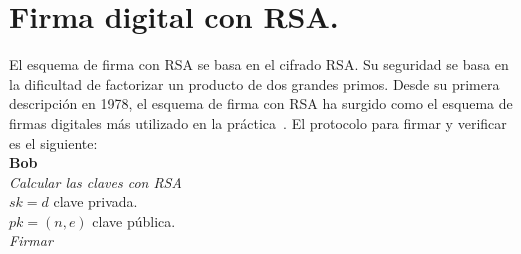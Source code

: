 










\section{Firma digital con RSA. }

El esquema de firma con RSA se basa en el cifrado RSA. Su seguridad se basa en la dificultad de factorizar un producto de dos grandes primos. Desde su primera descripción en 1978, el esquema de firma con RSA ha surgido como el esquema de firmas digitales más utilizado en la práctica~\cite{paar}. El protocolo para firmar y verificar es el siguiente: \\

\textbf{Bob}\\
\textit{Calcular las claves con RSA} \\

$ sk = d$ clave privada.\\

\textit{$ pk = (n, e) $} clave pública. \\
\textit{Firmar} \\

